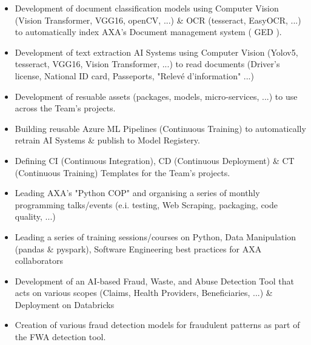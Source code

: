 \documentclass[10pt,letter,ragged2e,withhyper]{altacv}
\renewcommand{\divider}{\textcolor{body!30}{\hdashrule{\linewidth}{0.6pt}{0.5ex}}\medskip}
\begin{document}
\begin{paracol}{2}



\begin{itemize}
  \item Development of document classification models using Computer Vision (Vision Transformer, VGG16, openCV, ...) \& OCR (tesseract, EasyOCR, ...) to automatically index AXA's Document management system ( GED ).
  \item Development of text extraction AI Systems using Computer Vision (Yolov5, tesseract, VGG16, Vision Transformer, ...) to read documents (Driver's license, National ID card, Passeports, "Relevé d'information" ...)
  \item Development of resuable assets (packages, models, micro-services, ...) to use across the Team's projects.
  \item Building reusable Azure ML Pipelines (Continuous Training) to automatically retrain AI Systems \& publish to Model Registery.
  \item Defining CI (Continuous Integration), CD (Continuous Deployment) \& CT (Continuous Training) Templates for the Team's projects.
  \item Leading AXA's "Python COP" and organising a series of monthly programming talks/events (e.i. testing, Web Scraping, packaging, code quality, ...)
  \item Leading a series of training sessions/courses on Python, Data Manipulation (pandas \& pyspark), Software Engineering best practices for AXA collaborators
\end{itemize}

\divider
{}

\begin{itemize}
  \item Development of an AI-based Fraud, Waste, and Abuse Detection Tool that acts on various scopes (Claims, Health Providers, Beneficiaries, ...) \& Deployment on Databricks
  \item Creation of various fraud detection models for fraudulent patterns as part of the FWA detection tool.
\end{itemize}


\end{paracol}
\end{document}
